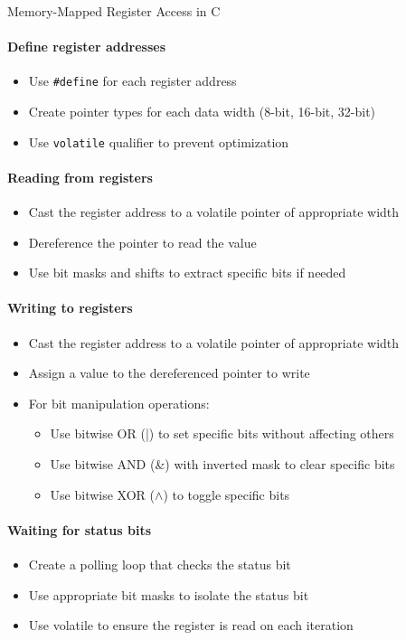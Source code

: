 \begin{KR}{Memory-Mapped Register Access in C}
\paragraph{Define register addresses}
\begin{itemize}
    \item Use \texttt{\#define} for each register address
    \item Create pointer types for each data width (8-bit, 16-bit, 32-bit)
    \item Use \texttt{volatile} qualifier to prevent optimization
\end{itemize}

\paragraph{Reading from registers}
\begin{itemize}
    \item Cast the register address to a volatile pointer of appropriate width
    \item Dereference the pointer to read the value
    \item Use bit masks and shifts to extract specific bits if needed
\end{itemize}

\paragraph{Writing to registers}
\begin{itemize}
    \item Cast the register address to a volatile pointer of appropriate width
    \item Assign a value to the dereferenced pointer to write
    \item For bit manipulation operations:
    \begin{itemize}
        \item Use bitwise OR (|) to set specific bits without affecting others
        \item Use bitwise AND (\&) with inverted mask to clear specific bits
        \item Use bitwise XOR ($\land$) to toggle specific bits
    \end{itemize}
\end{itemize}

\paragraph{Waiting for status bits}
\begin{itemize}
    \item Create a polling loop that checks the status bit
    \item Use appropriate bit masks to isolate the status bit
    \item Use volatile to ensure the register is read on each iteration
\end{itemize}
\end{KR}

